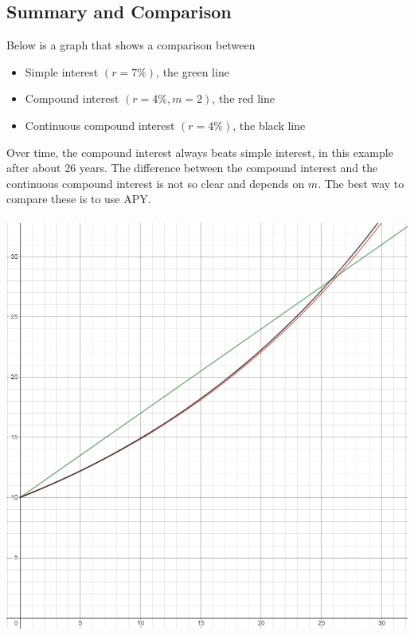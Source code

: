 \documentclass[14pt]{extarticle}
\begin{document}
\subsection{Summary and Comparison}
Below is a graph that shows a comparison between 
\begin{itemize}
	\item Simple interest $(r=7\%)$, the green line
	\item Compound interest $(r= 4\%, m = 2)$, the red line
	\item Continuous compound interest $(r=4\%)$, the black line
\end{itemize} 
Over time, the compound interest always beats simple interest, in this example after about 26 years. The difference between the compound interest and the continuous compound interest is not so clear and depends on $m$. The best way to compare these is to use APY.
\\\\
\includegraphics[width=0.85\linewidth]{3-1}
\end{document}

